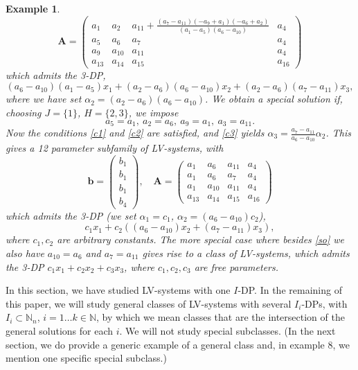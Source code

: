\documentclass{article}
\newcounter{NN}
\newtheorem{example}[NN]{Example}
\def\N{\mathbb{N}}
\def\A{\mathbf{A}}
\def\b{{\mathbf b}}
\begin{document}
\begin{example}
\begin{equation}
\A=\begin{pmatrix}
a_{1} & a_{2} & a_{11}+\frac{\left(a_{7}-a_{11}\right) \left(-a_{9}+a_{1}\right) \left(-a_{6}+a_{2}\right)}{\left(a_{1}-a_{5}\right) \left(a_{6}-a_{10}\right)} & a_{4} 
\\
 a_{5} & a_{6} & a_{7} & a_{4} 
\\
 a_{9} & a_{10} & a_{11} & a_{4} 
\\
 a_{13} & a_{14} & a_{15} & a_{16} 
\end{pmatrix}
\end{equation}
which admits the 3-DP,
\[
\left(a_{6}-a_{10}\right) \left(a_{1}-a_{5}\right)x_{1}
+\left(a_2-a_{6}\right) \left(a_{6}-a_{10}\right)x_{2}
+\left(a_2-a_{6}\right) \left(a_{7}-a_{11}\right) x_{3},
\]
where we have set $\alpha_{2} = \left(a_2-a_{6}\right) \left(a_{6}-a_{10}\right)$. We obtain a special solution if, choosing $J=\{1\}$, $H=\{2,3\}$, we impose
\begin{equation} \label{so}
a_{5} = a_{1},\
a_{2} = a_{6},\
a_{9} = a_{1},\
a_{3} = a_{11}.
\end{equation}
Now the conditions \eqref{c1} and \eqref{c2} are satisfied, and \eqref{c3} yields
$
\alpha_3=\frac{a_{7}-a_{11}}{a_{6}-a_{10}}\alpha_{2}$.
This gives a 12 parameter subfamily of LV-systems, with
\begin{equation} \label{SOS}
\b=\begin{pmatrix} b_1 \\ b_1 \\ b_1 \\ b_4 \end{pmatrix},\quad
\A=\begin{pmatrix} 
a_{1} & a_{6} & a_{11} & a_{4} 
\\
 a_{1} & a_{6} & a_{7} & a_{4} 
\\
 a_{1} & a_{10} & a_{11} & a_{4} 
\\
 a_{13} & a_{14} & a_{15} & a_{16} 
\end{pmatrix}
\end{equation}
which admits the 3-DP (we set $\alpha_1=c_1$, $\alpha_2=(a_6-a_{10})c_2$),
\[
c_1x_1+c_2\left((a_6-a_{10})x_2+(a_{7}-a_{11})x_3\right),
\]
where $c_1,c_2$ are arbitrary constants.
The more special case where besides \eqref{so} we also have $a_{10}=a_6$ and $a_{7}=a_{11}$ gives rise to a class of LV-systems, which admits the 3-DP $c_1x_1+c_2x_2+c_3x_3$, where $c_1,c_2,c_3$ are free parameters. 
\end{example}

In this section, we have studied LV-systems with one $I$-DP. In the remaining of this paper, we will study general classes of LV-systems with several $I_i$-DPs, with $I_i\subset \N_n$, $i=1\ldots k\in \N$, by which we mean classes that are the intersection of the general solutions for each $i$. We will not study special subclasses. (In the next section, we do provide a generic example of a general class and, in example 8, we mention one specific special subclass.)
\end{document}
